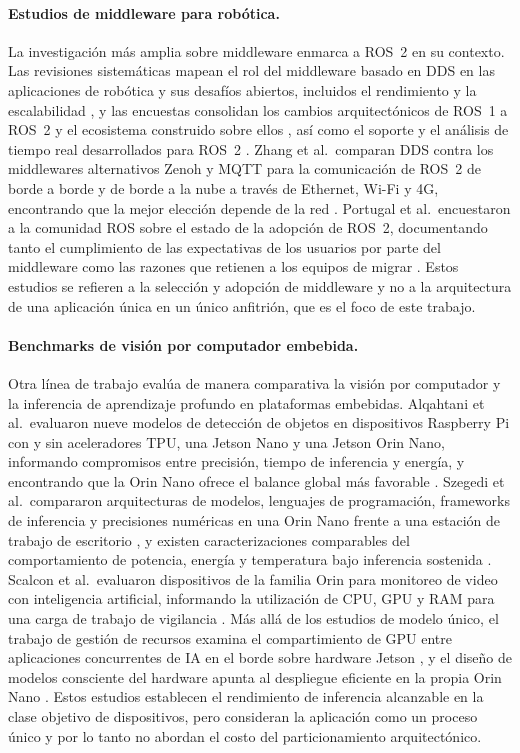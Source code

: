 \paragraph{Estudios de middleware para robótica.}
La investigación más amplia sobre middleware enmarca a ROS~2 en su contexto.
Las revisiones sistemáticas mapean el rol del middleware basado en DDS en
las aplicaciones de robótica y sus desafíos abiertos, incluidos el
rendimiento y la escalabilidad \cite{gambo2025}, y las encuestas consolidan
los cambios arquitectónicos de ROS~1 a ROS~2 y el ecosistema construido
sobre ellos \cite{al-batati2026}, así como el soporte y el análisis de
tiempo real desarrollados para ROS~2 \cite{casini2026}. Zhang et al.\
comparan DDS contra los middlewares alternativos Zenoh y MQTT para la
comunicación de ROS~2 de borde a borde y de borde a la nube a través de
Ethernet, Wi-Fi y 4G, encontrando que la mejor elección depende de la red
\cite{zhang2024}. Portugal et al.\ encuestaron a la comunidad ROS sobre el
estado de la adopción de ROS~2, documentando tanto el cumplimiento de las
expectativas de los usuarios por parte del middleware como las razones que
retienen a los equipos de migrar \cite{portugal2025}. Estos estudios se
refieren a la selección y adopción de middleware y no a la arquitectura de
una aplicación única en un único anfitrión, que es el foco de este trabajo.

\paragraph{Benchmarks de visión por computador embebida.}
Otra línea de trabajo evalúa de manera comparativa la visión por computador
y la inferencia de aprendizaje profundo en plataformas embebidas. Alqahtani
et al.\ evaluaron nueve modelos de detección de objetos en dispositivos
Raspberry Pi con y sin aceleradores TPU, una Jetson Nano y una Jetson Orin
Nano, informando compromisos entre precisión, tiempo de inferencia y
energía, y encontrando que la Orin Nano ofrece el balance global más
favorable \cite{alqahtani2026}. Szegedi et al.\ compararon arquitecturas de
modelos, lenguajes de programación, frameworks de inferencia y precisiones
numéricas en una Orin Nano frente a una estación de trabajo de escritorio
\cite{szegedi2026}, y existen caracterizaciones comparables del
comportamiento de potencia, energía y temperatura bajo inferencia sostenida
\cite{tang2026}. Scalcon et al.\ evaluaron dispositivos de la familia Orin
para monitoreo de video con inteligencia artificial, informando la
utilización de CPU, GPU y RAM para una carga de trabajo de vigilancia
\cite{scalcon2024}. Más allá de los estudios de modelo único, el trabajo de
gestión de recursos examina el compartimiento de GPU entre aplicaciones
concurrentes de IA en el borde sobre hardware Jetson \cite{woo2025}, y el
diseño de modelos consciente del hardware apunta al despliegue eficiente en
la propia Orin Nano \cite{aalishah2025}. Estos estudios establecen el
rendimiento de inferencia alcanzable en la clase objetivo de dispositivos,
pero consideran la aplicación como un proceso único y por lo tanto no
abordan el costo del particionamiento arquitectónico.

